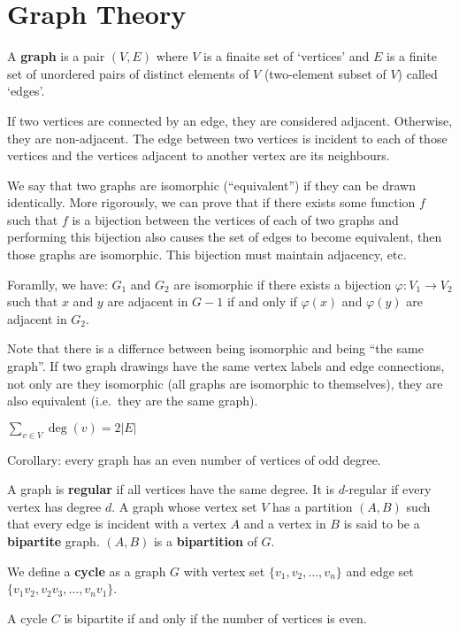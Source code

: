 \documentclass[12pt]{article}
\begin{document}
\section{Graph Theory}
A {\bf graph} is a pair $(V,E)$ where $V$ is a finaite set of `vertices' and $E$ is a finite set of unordered pairs of distinct elements of $V$ (two-element subset of $V$) called `edges'.

If two vertices are connected by an edge, they are considered adjacent. Otherwise, they are non-adjacent. The edge between two vertices is incident to each of those vertices and the vertices adjacent to another vertex are its neighbours.

We say that two graphs are isomorphic (``equivalent'') if they can be drawn identically. More rigorously, we can prove that if there exists some function $f$ such that $f$ is a bijection between the vertices of each of two graphs and performing this bijection also causes the set of edges to become equivalent, then those graphs are isomorphic. This bijection must maintain adjacency, etc.

Foramlly, we have: $G_1$ and $G_2$ are isomorphic if there exists a bijection $\varphi : V_1 \to V_2$ such that $x$ and $y$ are adjacent in $G-1$ if and only if $\varphi(x)$ and $\varphi(y)$ are adjacent in $G_2$.

Note that there is a differnce between being isomorphic and being ``the same graph''. If two graph drawings have the same vertex labels and edge connections, not only are they isomorphic (all graphs are isomorphic to themselves), they are also equivalent (i.e.\ they are the same graph).

\begin{theorem}
$\displaystyle\sum_{v\in V} \deg(v) = 2|E|$
\end{theorem}

Corollary: every graph has an even number of vertices of odd degree.

A graph is {\bf regular} if all vertices have the same degree. It is $d$-regular if every vertex has degree $d$. A graph whose vertex set $V$ has a partition $(A,B)$ such that every edge is incident with a vertex $A$ and a vertex in $B$ is said to be a {\bf bipartite} graph. $(A,B)$ is a {\bf bipartition} of $G$.

We define a {\bf cycle} as a graph $G$ with vertex set $\{v_1, v_2, \dots, v_n\}$ and edge set $\{v_1v_2, v_2v_3, \dots, v_n v_1\}$.

\begin{lemma}
A cycle $C$ is bipartite if and only if the number of vertices is even.
\end{lemma}
\end{document}
